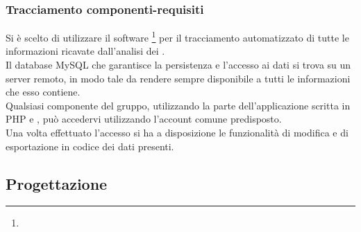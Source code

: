 \documentclass[NormeDiProgetto.tex]{subfiles}
\begin{document}
\subsubsection{Tracciamento componenti-requisiti}
Si è scelto di utilizzare il software \footnote{} per il tracciamento automatizzato di tutte le informazioni ricavate dall'analisi dei .\\
Il database MySQL che garantisce la persistenza e l'accesso ai dati si trova su un server remoto, in modo tale da rendere sempre disponibile a tutti le informazioni che esso contiene.\\
Qualsiasi componente del gruppo, utilizzando la parte  dell'applicazione scritta in PHP e , può accedervi utilizzando l'account comune predisposto.\\
Una volta effettuato l'accesso si ha a disposizione le funzionalità di modifica e di esportazione in codice  dei dati presenti.\\



\subsection{Progettazione}
\end{document}
